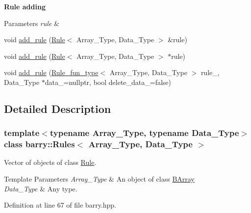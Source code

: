 \begin{Indent}\textbf{ Rule adding}\par
{\em 
\begin{DoxyParams}{Parameters}
{\em rule} & \\
\hline
\end{DoxyParams}
}\begin{DoxyCompactItemize}
\item 
void \hyperlink{classbarry_1_1_rules_a60583152fddcb11178dcf3d02a924d7c}{add\+\_\+rule} (\hyperlink{classbarry_1_1_rule}{Rule}$<$ Array\+\_\+\+Type, Data\+\_\+\+Type $>$ \&rule)
\item 
void \hyperlink{classbarry_1_1_rules_abd60b1d381ad0c8a772e4d81264bbe0a}{add\+\_\+rule} (\hyperlink{classbarry_1_1_rule}{Rule}$<$ Array\+\_\+\+Type, Data\+\_\+\+Type $>$ $\ast$rule)
\item 
void \hyperlink{classbarry_1_1_rules_abbc63747014445b538384bb500464bb5}{add\+\_\+rule} (\hyperlink{namespacebarry_a3b914cb0dafdd5e5c19d142e8fa96c92}{Rule\+\_\+fun\+\_\+type}$<$ Array\+\_\+\+Type, Data\+\_\+\+Type $>$ rule\+\_\+, Data\+\_\+\+Type $\ast$data\+\_\+=nullptr, bool delete\+\_\+data\+\_\+=false)
\end{DoxyCompactItemize}
\end{Indent}


\subsection{Detailed Description}
\subsubsection*{template$<$typename Array\+\_\+\+Type, typename Data\+\_\+\+Type$>$\newline
class barry\+::\+Rules$<$ Array\+\_\+\+Type, Data\+\_\+\+Type $>$}

Vector of objects of class \hyperlink{classbarry_1_1_rule}{Rule}. 


\begin{DoxyTemplParams}{Template Parameters}
{\em Array\+\_\+\+Type} & An object of class {\ttfamily \hyperlink{classbarry_1_1_b_array}{B\+Array}} \\
\hline
{\em Data\+\_\+\+Type} & Any type. \\
\hline
\end{DoxyTemplParams}


Definition at line 67 of file barry.\+hpp.



